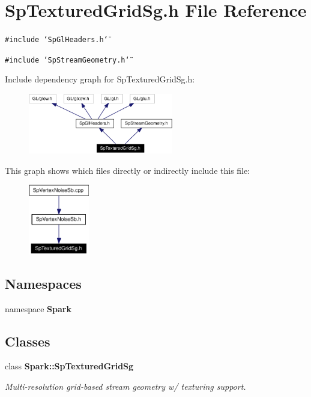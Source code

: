 \section{Sp\-Textured\-Grid\-Sg.h File Reference}
\label{SpTexturedGridSg_8h}
{\tt \#include \char`\"{}Sp\-Gl\-Headers.h\char`\"{}}\par
{\tt \#include \char`\"{}Sp\-Stream\-Geometry.h\char`\"{}}\par


Include dependency graph for Sp\-Textured\-Grid\-Sg.h:\begin{figure}[H]
\begin{center}
\leavevmode
\includegraphics[width=179pt]{SpTexturedGridSg_8h__incl}
\end{center}
\end{figure}


This graph shows which files directly or indirectly include this file:\begin{figure}[H]
\begin{center}
\leavevmode
\includegraphics[width=75pt]{SpTexturedGridSg_8h__dep__incl}
\end{center}
\end{figure}
\subsection*{Namespaces}
\begin{CompactItemize}
\item 
namespace {\bf Spark}
\end{CompactItemize}
\subsection*{Classes}
\begin{CompactItemize}
\item 
class {\bf Spark::Sp\-Textured\-Grid\-Sg}
\begin{CompactList}\small\item\em Multi-resolution grid-based stream geometry w/ texturing support. \item\end{CompactList}\end{CompactItemize}
